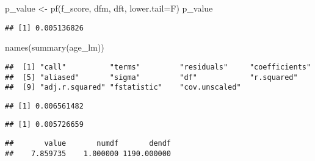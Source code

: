 \documentclass[
]{article}
\newenvironment{Shaded}{\begin{snugshade}}{\end{snugshade}}
\newcommand{\AttributeTok}[1]{\textcolor[rgb]{0.77,0.63,0.00}{#1}}
\newcommand{\FunctionTok}[1]{\textcolor[rgb]{0.00,0.00,0.00}{#1}}
\newcommand{\NormalTok}[1]{#1}
\newcommand{\OtherTok}[1]{\textcolor[rgb]{0.56,0.35,0.01}{#1}}
\newcommand{\SpecialCharTok}[1]{\textcolor[rgb]{0.00,0.00,0.00}{#1}}
\begin{document}
\begin{Shaded}
\begin{Highlighting}[]
\NormalTok{p\_value }\OtherTok{\textless{}{-}} \FunctionTok{pf}\NormalTok{(f\_score, dfm, dft, }\AttributeTok{lower.tail=}\NormalTok{F)}
\NormalTok{p\_value}
\end{Highlighting}
\end{Shaded}

\begin{verbatim}
## [1] 0.005136826
\end{verbatim}

\begin{Shaded}
\begin{Highlighting}[]
\FunctionTok{names}\NormalTok{(}\FunctionTok{summary}\NormalTok{(age\_lm))}
\end{Highlighting}
\end{Shaded}

\begin{verbatim}
##  [1] "call"          "terms"         "residuals"     "coefficients" 
##  [5] "aliased"       "sigma"         "df"            "r.squared"    
##  [9] "adj.r.squared" "fstatistic"    "cov.unscaled"
\end{verbatim}

\begin{Shaded}
\end{Shaded}

\begin{verbatim}
## [1] 0.006561482
\end{verbatim}

\begin{Shaded}
\end{Shaded}

\begin{verbatim}
## [1] 0.005726659
\end{verbatim}

\begin{Shaded}
\end{Shaded}

\begin{verbatim}
##       value       numdf       dendf 
##    7.859735    1.000000 1190.000000
\end{verbatim}
\end{document}
